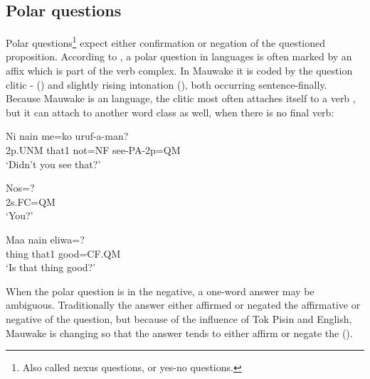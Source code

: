 





\subsection{  Polar questions}
\hypertarget{RefHeading22761935131865}{}
Polar questions\footnote{Also called nexus questions, or yes-no questions.} expect either confirmation or negation of the questioned proposition. According to \citet[63]{Wurm1982}, a polar question in  languages is often marked by an affix which is part of the verb complex. In Mauwake it is coded by the question clitic -  () and slightly rising intonation (), both occurring sentence-finally.  Because Mauwake is an  language, the clitic most often attaches itself to a verb , but it can attach to another word class as well, when there is no final verb:

\ea%
\label{ex:x1179}
\gll Ni  nain  me=ko  uruf-a-man? \\
2p.UNM  that1  not=NF  see-PA-2p=QM   \\
\glt `Didn't you see that?'
\z





\ea%
\label{ex:x1180}
\gll Nos=? \\
2s.FC=QM      \\
\glt `You?'
\z





\ea%
\label{ex:x1181}
\gll Maa  nain  eliwa=? \\
thing  that1  good=CF.QM      \\
\glt `Is that thing good?'
\z





When the polar question is in the negative, a one-word answer may be ambiguous. Traditionally the answer either affirmed or negated the affirmative or negative  of the question, but because of the influence of Tok Pisin and English, Mauwake is changing so that the answer tends to either affirm or negate the  ().

